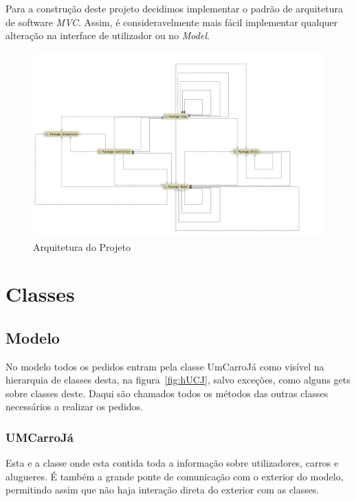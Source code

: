 \documentclass[a4paper]{report}
\begin{document}
Para a construção deste projeto decidimos implementar o padrão de arquitetura de software \textit{MVC}.
Assim, é consideravelmente mais fácil implementar qualquer alteração na interface de utilizador ou no \textit{Model}.

\begin{figure}[h]
    \includegraphics[scale=0.4]{hierarquia.png}
    \caption{Arquitetura do Projeto}
\end{figure}

\chapter{Classes}\label{chap:api}

\section{Modelo}

No modelo todos os pedidos entram pela classe UmCarroJá como visível na hierarquia de classes desta,
na figura~\ref{fig:hUCJ}, salvo exceções, como alguns gets sobre classes deste. Daqui são chamados
todos os métodos das outras classes necessários a realizar os pedidos.

\subsection{UMCarroJá}

Esta e a classe onde esta contida toda a informação sobre utilizadores,
carros e alugueres. É também a grande ponte de comunicação com o exterior
do modelo, permitindo assim que não haja interação direta do exterior com
as classes.
\end{document}
